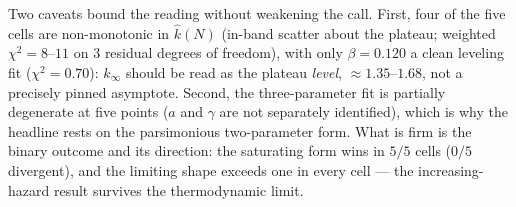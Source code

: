 \documentclass[pdflatex,sn-mathphys,Numbered]{sn-jnl}
\begin{document}
\begin{appendices}
Two caveats bound the reading without weakening the call. First, four of the
five cells are non-monotonic in $\hat k(N)$ (in-band scatter about the plateau;
weighted $\chi^2 = 8$--$11$ on $3$ residual degrees of freedom), with only
$\beta = 0.120$ a clean leveling fit ($\chi^2 = 0.70$): $k_\infty$ should be
read as the plateau \emph{level}, ${\approx}1.35$--$1.68$, not a precisely
pinned asymptote. Second, the three-parameter fit is partially degenerate at
five points ($a$ and $\gamma$ are not separately identified), which is why the
headline rests on the parsimonious two-parameter form. What is firm is the
binary outcome and its direction: the saturating form wins in $5/5$ cells
($0/5$ divergent), and the limiting shape exceeds one in every cell --- the
increasing-hazard result survives the thermodynamic limit.

\end{appendices}


\end{document}
